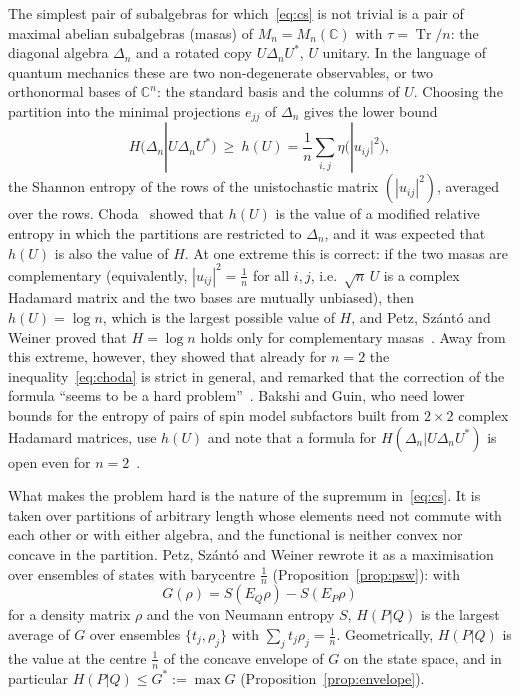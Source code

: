 \documentclass[11pt]{article}
\DeclareMathOperator{\Tr}{Tr}
\newcommand{\C}{\mathbb{C}}
\theoremstyle{plain}
\theoremstyle{definition}
\theoremstyle{remark}
\begin{document}
The simplest pair of subalgebras for which~\eqref{eq:cs} is not trivial is a pair of maximal abelian subalgebras (masas)
of $M_n=M_n(\C)$ with $\tau=\Tr/n$: the diagonal algebra $\Delta_n$ and a rotated copy $U\Delta_nU^*$, $U$ unitary. In
the language of quantum mechanics these are two non-degenerate observables, or two orthonormal bases of $\C^n$: the
standard basis and the columns of $U$. Choosing the partition into the minimal projections $e_{jj}$ of $\Delta_n$ gives
the lower bound
\begin{equation}\label{eq:choda}
  H(\Delta_n|U\Delta_nU^*)\ \ge\ h(U)=\frac1n\sum_{i,j}\eta\bigl(|u_{ij}|^2\bigr),
\end{equation}
the Shannon entropy of the rows of the unistochastic matrix $(|u_{ij}|^2)$, averaged over the rows. Choda~\cite{choda}
showed that $h(U)$ is the value of a modified relative entropy in which the partitions are restricted to $\Delta_n$, and it
was expected that $h(U)$ is also the value of $H$. At one extreme this is correct: if the two masas are complementary
(equivalently, $|u_{ij}|^2=\frac1n$ for all $i,j$, i.e.\ $\sqrt n\,U$ is a complex Hadamard matrix and the two bases are
mutually unbiased), then $h(U)=\log n$, which is the largest possible value of $H$, and Petz, Sz\'ant\'o and Weiner proved that
$H=\log n$ holds only for complementary masas~\cite[Theorem~3]{petz2009}. Away from this extreme, however, they showed that
already for $n=2$ the inequality~\eqref{eq:choda} is strict in general, and remarked that the correction of the formula
``seems to be a hard problem''~\cite[Appendix]{petz2009}. Bakshi and Guin, who need lower bounds for the entropy of pairs
of spin model subfactors built from $2\times2$ complex Hadamard matrices, use $h(U)$ and note that a formula for
$H(\Delta_n|U\Delta_nU^*)$ is open even for $n=2$~\cite[Section~2.3 and Theorem~6.22]{bakshi}.

What makes the problem hard is the nature of the supremum in~\eqref{eq:cs}. It is taken over partitions of arbitrary
length whose elements need not commute with each other or with either algebra, and the functional is neither convex nor
concave in the partition. Petz, Sz\'ant\'o and Weiner rewrote it as a maximisation over ensembles of states with
barycentre $\frac1n$ (Proposition~\ref{prop:psw}): with
\[
  G(\rho)=S(E_Q\rho)-S(E_P\rho)
\]
for a density matrix $\rho$ and the von Neumann entropy $S$, $H(P|Q)$ is the largest average of $G$ over ensembles
$\{t_j,\rho_j\}$ with $\sum_jt_j\rho_j=\frac1n$. Geometrically, $H(P|Q)$ is the value at the centre $\frac1n$ of the concave
envelope of $G$ on the state space, and in particular $H(P|Q)\le G^*:=\max G$ (Proposition~\ref{prop:envelope}).
\end{document}
